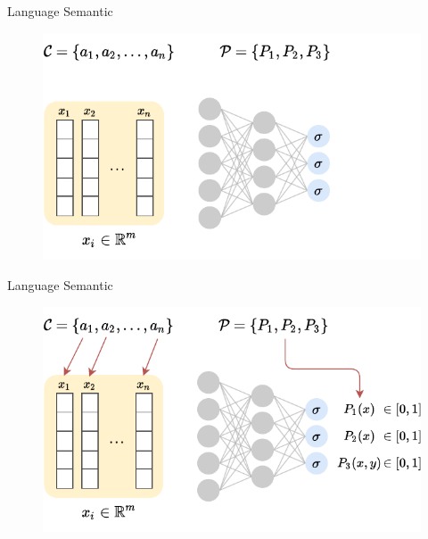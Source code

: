 \documentclass{beamer}
\begin{document}
%	
%	
%	

\begin{frame}{Language Semantic}
			\begin{figure}
		\centering
		\includegraphics[width=\linewidth]{images/interpretation_intuition0.pdf}
	\end{figure}
	
\end{frame}
\begin{frame}{Language Semantic}
	\begin{figure}
		\centering
		\includegraphics[width=\linewidth]{images/interpretation_intuition1.pdf}
	\end{figure}
\end{frame}
\end{document}

